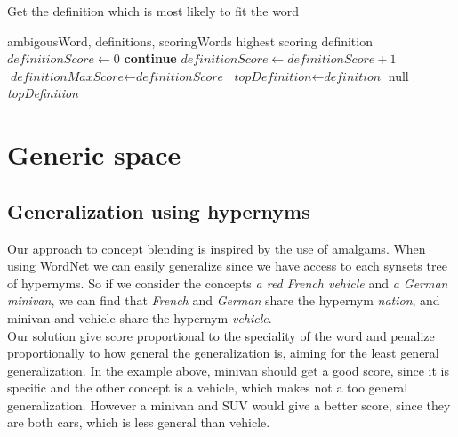 \begin{algorithm}
	\caption{Get the definition which is most likely to fit the word}\label{euclid}
	\begin{algorithmic}[1]
		\Require ambigousWord,
		definitions,
		scoringWords
		\Ensure highest scoring definition
		\State $\textit{definitionScore} \gets 0$
		\State \textbf{continue}
		\EndIf
		\State ${\textit{definitionScore} \gets {\textit{definitionScore}+1}}$
		\EndIf
		\EndFor
		\EndFor
		\State ${\textit{definitionMaxScore}} \gets {\textit{definitionScore}}$
		\State ${\textit{topDefinition}} \gets {\textit{definition}}$
		\EndIf
		\EndFor
		\Return null
		\EndIf
		\State \Return \textit{topDefinition}
		\EndProcedure
	\end{algorithmic}
\end{algorithm}


\section{Generic space}
\subsection{Generalization using hypernyms}
Our approach to concept blending is inspired by the use of amalgams. When using WordNet we can easily generalize since we have access to each synsets tree of hypernyms. So if we consider the concepts \emph{a red French vehicle} and \emph{a German minivan}, we can find that \emph{French} and \emph{German} share the hypernym \emph{nation}, and minivan and vehicle share the hypernym \emph{vehicle}.\\
Our solution give score proportional to the speciality of the word and penalize proportionally to how general the generalization is, aiming for the least general generalization. In the example above, minivan should get a good score, since it is specific and the other concept is a vehicle, which makes not a too general generalization. However a minivan and SUV would give a better score, since they are both cars, which is less general than vehicle.

